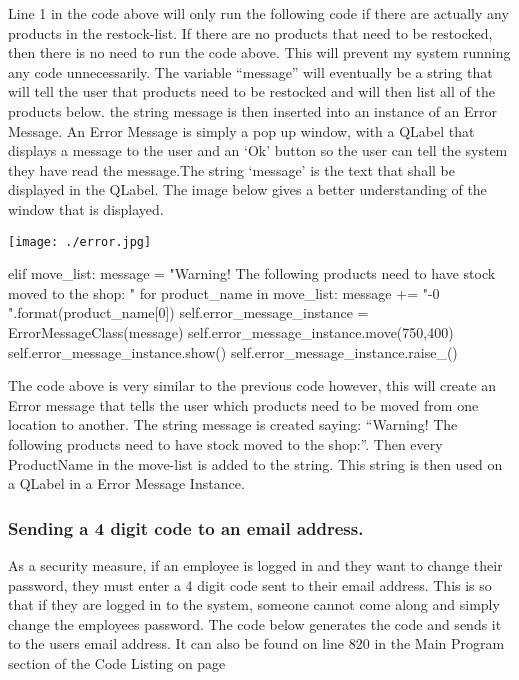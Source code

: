 Line 1 in the code above will only run the following code if there are actually any products in the restock-list. If there are no products that need to be restocked, then there is no need to run the code above. This will prevent my system running any code unnecessarily. The variable ``message'' will eventually be a string that will tell the user that products need to be restocked and will then list all of the products below. the string message is then inserted into an instance of an Error Message. An Error Message is simply a pop up window, with a QLabel that displays a message to the user and an `Ok' button so the user can tell the system they have read the message.The string `message' is the text that shall be displayed in the QLabel. The image below gives a better understanding of the window that is displayed.

\texttt{[image: ./error.jpg]}
\label{fig:move-stock-message}

\begin{python}
elif move_list:
            message = "Warning! \n \n The following products need to have stock moved to the shop: \n \n"
            for product_name in move_list:
                message += "-{0} \n".format(product_name[0])
            self.error_message_instance = ErrorMessageClass(message)
            self.error_message_instance.move(750,400)
            self.error_message_instance.show()
            self.error_message_instance.raise_()
\end{python}

The code above is very similar to the previous code however, this will create an Error message that tells the user which products need to be moved from one location to another. The string message is created saying: ``Warning! The following products need to have stock moved to the shop:''. Then every ProductName in the move-list is added to the string. This string is then used on a QLabel in a Error Message Instance.

\pagebreak

\subsubsection{Sending a 4 digit code to an email address.}

As a security measure, if an employee is logged in and they want to change their password, they must enter a 4 digit code sent to their email address. This is so that if they are logged in to the system, someone cannot come along and simply change the employees password. The code below generates the code and sends it to the users email address. It can also be found on line 820 in the Main Program section of the Code Listing on page \pageref{X}

